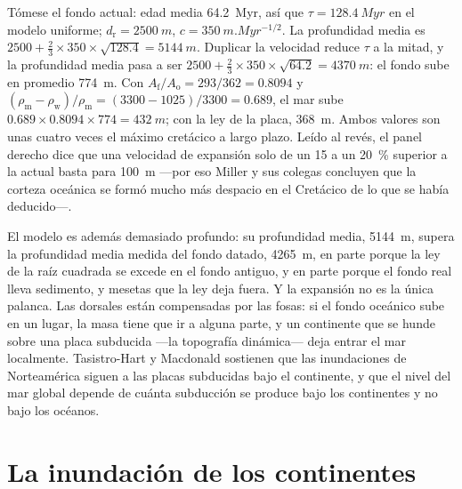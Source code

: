 \begin{example}\label{ex:b2:phanerozoic-earth:doubling}
Tómese el fondo actual: edad media \qty{64.2}{Myr}, así que $\tau = \qty{128.4}{Myr}$ en el modelo uniforme;
$d_{\text{r}} = \qty{2500}{m}$, $c = \qty{350}{m.Myr^{-1/2}}$. La profundidad media es $2500 + \tfrac23
\times 350 \times \sqrt{128.4} = \qty{5144}{m}$. Duplicar la velocidad reduce $\tau$ a la mitad, y la profundidad
media pasa a ser $2500 + \tfrac23 \times 350 \times \sqrt{64.2} = \qty{4370}{m}$: el fondo sube en promedio
\qty{774}{m}. Con $A_{\text{f}}/A_{\text{o}} = 293/362 = 0.8094$ y
$(\rho_{\text{m}} - \rho_{\text{w}})/\rho_{\text{m}} = (3300 - 1025)/3300 = 0.689$, el mar sube
$0.689 \times 0.8094 \times 774 = \qty{432}{m}$; con la ley de la placa, \qty{368}{m}. Ambos valores son
unas cuatro veces el máximo cretácico a largo plazo. Leído al revés, el panel derecho dice que una
velocidad de expansión solo de un 15 a un \qty{20}{\percent} superior a la actual basta para \qty{100}{m} ---por
eso Miller y sus colegas concluyen que la corteza oceánica se formó mucho más despacio en el
Cretácico de lo que se había deducido---.
\end{example}

El modelo es además demasiado profundo: su profundidad media, \qty{5144}{m}, supera la profundidad media medida del
fondo datado, \qty{4265}{m}, en parte porque la ley de la raíz cuadrada se excede en el fondo antiguo, y
en parte porque el fondo real lleva sedimento,  y mesetas que la ley deja fuera. Y la expansión no es la
única palanca. Las dorsales están compensadas por las fosas: si el fondo oceánico sube en un lugar, la masa tiene que
ir a alguna parte, y un continente que se hunde sobre una placa subducida ---la topografía dinámica--- deja entrar el mar
localmente. Tasistro-Hart y Macdonald sostienen que las inundaciones de Norteamérica siguen a las placas subducidas
bajo el continente, y que el nivel del mar global depende de cuánta subducción se produce bajo los
continentes y no bajo los océanos.

\section{La inundación de los continentes}\label{sec:b2:phanerozoic-earth:flooding}

